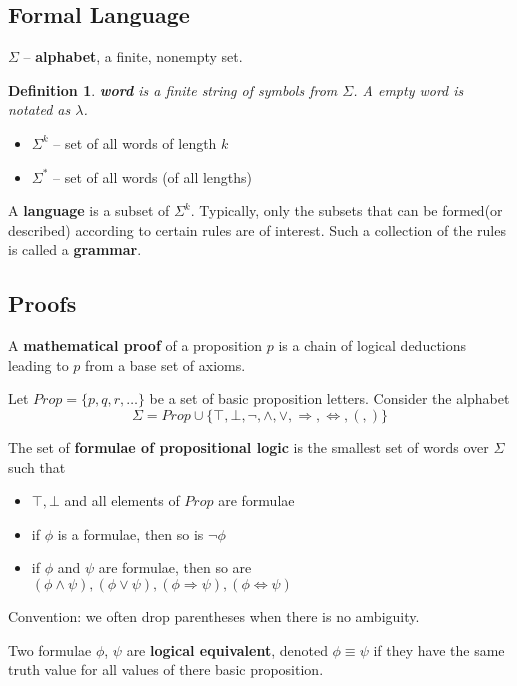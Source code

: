 \documentclass{ctexart}
\newtheorem{definition}{\indent Definition}[section]
\begin{document}
\subsection{Formal Language}
$\Sigma$ -- \textbf{alphabet}, a finite, nonempty set.
\begin{definition}
    \textbf{word} is a finite string of symbols from $\Sigma$. A empty word is notated as $\lambda$.
\end{definition}
\begin{itemize}[leftmargin = 50 pt]
    \item 
        $\Sigma ^{k}$ -- set of all words of length $k$
    \item
        $\Sigma ^{*}$ -- set of all words (of all lengths)
\end{itemize}

A \textbf{language} is a subset of $\Sigma ^ {k} $. Typically, only the subsets that can be formed(or described) according to certain rules are of interest. Such a collection of the rules is called a \textbf{grammar}.

\subsection{Proofs}

A \textbf{mathematical proof} of a proposition $p$ is a chain of logical deductions leading to $p$ from a base set of axioms.

Let $Prop = \{p,q,r,\ldots\}$ be a set of basic proposition letters. Consider the alphabet
\[
    \Sigma = Prop \cup \{\top, \bot, \lnot, \land, \lor, \Rightarrow , \Leftrightarrow , (,)\}
\]

The set of \textbf{formulae of propositional logic} is the smallest set of words over $\Sigma$ such that

\begin{itemize}[leftmargin = 50 pt]
    \item $\top, \bot$ and all elements of $Prop$ are formulae
    \item if $\phi $ is a formulae, then so is $\lnot \phi$
    \item if $\phi$ and $\psi $ are formulae, then so are $(\phi \land \psi), (\phi \lor \psi), (\phi \Rightarrow \psi), (\phi \Leftrightarrow \psi)$
\end{itemize}

Convention: we often drop parentheses when there is no ambiguity.

Two formulae $\phi$, $\psi$ are \textbf{logical equivalent}, denoted $\phi \equiv \psi$ if they have the same truth value for all values of there basic proposition.
\end{document}
